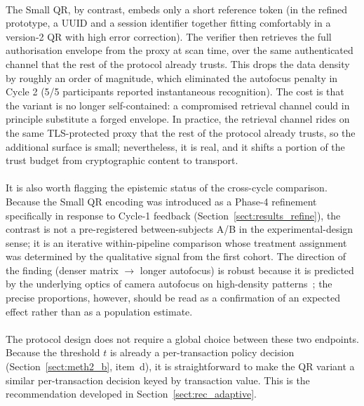 \paragraph{}The Small QR, by contrast, embeds only a short reference token (in the refined prototype, a UUID and a session identifier together fitting comfortably in a version-2 QR with high error correction). The verifier then retrieves the full authorisation envelope from the proxy at scan time, over the same authenticated channel that the rest of the protocol already trusts. This drops the data density by roughly an order of magnitude, which eliminated the autofocus penalty in Cycle 2 (5/5 participants reported instantaneous recognition). The cost is that the variant is no longer self-contained: a compromised retrieval channel could in principle substitute a forged envelope. In practice, the retrieval channel rides on the same TLS-protected proxy that the rest of the protocol already trusts, so the additional surface is small; nevertheless, it is real, and it shifts a portion of the trust budget from cryptographic content to transport.

\paragraph{}It is also worth flagging the epistemic status of the cross-cycle comparison. Because the Small QR encoding was introduced as a Phase-4 refinement specifically in response to Cycle-1 feedback (Section~\ref{sect:results_refine}), the contrast is not a pre-registered between-subjects A/B in the experimental-design sense; it is an iterative within-pipeline comparison whose treatment assignment was determined by the qualitative signal from the first cohort. The direction of the finding (denser matrix $\rightarrow$ longer autofocus) is robust because it is predicted by the underlying optics of camera autofocus on high-density patterns~\cite{corpuz2025}; the precise proportions, however, should be read as a confirmation of an expected effect rather than as a population estimate.

\paragraph{}The protocol design does not require a global choice between these two endpoints. Because the threshold $t$ is already a per-transaction policy decision (Section~\ref{sect:meth2_b}, item~d), it is straightforward to make the QR variant a similar per-transaction decision keyed by transaction value. This is the recommendation developed in Section~\ref{sect:rec_adaptive}.

